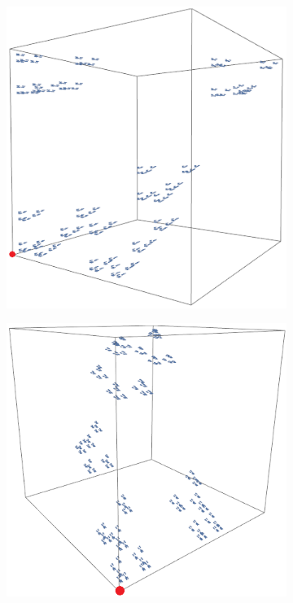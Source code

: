 \begin{figure}[h]
	\centering
	\begin{subfigure}{0.35\textwidth}
		\centering
		\includegraphics[width=0.8\linewidth]{pics/ch-upper-reg/sponge11.png}
		\label{ch-upper-reg:fig:sub1}
	\end{subfigure}%
	\begin{subfigure}{0.35\textwidth}
		\centering
		\includegraphics[width=0.85\linewidth]{pics/ch-upper-reg/sponge12.png}
		\label{ch-upper-reg:fig:sub2}
	\end{subfigure}%

\end{figure}
